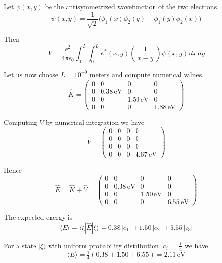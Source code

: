 \documentclass[12pt]{article}
\begin{document}
Let $\psi(x,y)$ be the antisymmetrized wavefunction of the two electrons.
\begin{equation*}
\psi(x,y)=\frac{1}{\sqrt{2}}\big(\phi_1(x)\phi_2(y)-\phi_1(y)\phi_2(x)\big)
\end{equation*}

Then
\begin{equation*}
V=\frac{e^2}{4\pi\epsilon_0}\int_0^L\int_0^L
\psi^*(x,y)\left(\frac{1}{|x-y|}\right)\psi(x,y)\,dx\,dy
\end{equation*}

Let us now choose $L=10^{-9}$ meters and compute numerical values.
\begin{equation*}
\hat{K}=\begin{pmatrix}
0 & 0 & 0 & 0\\
0 & 0.38\,\text{eV} & 0 & 0\\
0 & 0 & 1.50\,\text{eV} & 0\\
0 & 0 & 0 & 1.88\,\text{eV}
\end{pmatrix}
\end{equation*}

Computing $V$ by numerical integration we have
\begin{equation*}
\hat{V}=\begin{pmatrix}
0 & 0 & 0 & 0\\
0 & 0 & 0 & 0\\
0 & 0 & 0 & 0\\
0 & 0 & 0 & 4.67\,\text{eV}
\end{pmatrix}
\end{equation*}

Hence
\begin{equation*}
\hat{E}=\hat{K}+\hat{V}=\begin{pmatrix}
0 & 0 & 0 & 0\\
0 & 0.38\,\text{eV} & 0 & 0\\
0 & 0 & 1.50\,\text{eV} & 0\\
0 & 0 & 0 & 6.55\,\text{eV}
\end{pmatrix}
\end{equation*}

The expected energy is
\begin{equation*}
\langle E\rangle=\langle\xi|\hat E|\xi\rangle=0.38\,|c_1|+1.50\,|c_2|+6.55\,|c_3|
\end{equation*}

For a state $|\xi\rangle$ with uniform probability distribution $|c_i|=\tfrac{1}{4}$ we have
\begin{equation*}
\langle E\rangle=\tfrac{1}{4}(0.38+1.50+6.55)=2.11\,\text{eV}
\end{equation*}
\end{document}
